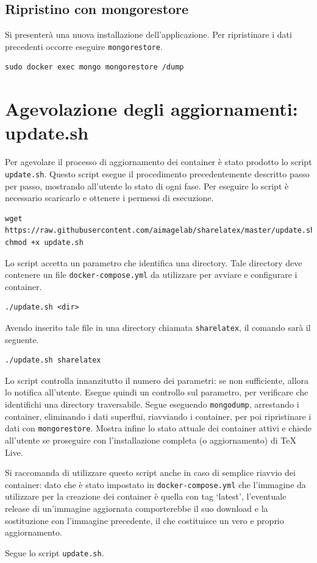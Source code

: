 \subsection{Ripristino con mongorestore}
Si presenterà una nuova installazione dell'applicazione. Per ripristinare i dati precedenti occorre eseguire \verb|mongorestore|.
\begin{lstlisting}
sudo docker exec mongo mongorestore /dump
\end{lstlisting}

\section{Agevolazione degli aggiornamenti: update.sh}
Per agevolare il processo di aggiornamento dei container è stato prodotto lo script \verb|update.sh|. Questo script esegue il procedimento precedentemente descritto passo per passo, mostrando all'utente lo stato di ogni fase. Per eseguire lo script è necessario scaricarlo e ottenere i permessi di esecuzione.
\begin{lstlisting}
wget https://raw.githubusercontent.com/aimagelab/sharelatex/master/update.sh
chmod +x update.sh
\end{lstlisting}
Lo script accetta un parametro che identifica una directory. Tale directory deve contenere un file \verb|docker-compose.yml| da utilizzare per avviare e configurare i container.
\begin{lstlisting}
./update.sh <dir>
\end{lstlisting}
Avendo inserito tale file in una directory chiamata \verb|sharelatex|, il comando sarà il seguente.
\begin{lstlisting}
./update.sh sharelatex
\end{lstlisting}
Lo script controlla innanzitutto il numero dei parametri: se non sufficiente, allora lo notifica all'utente. Esegue quindi un controllo sul parametro, per verificare che identifichi una directory traversabile. Segue eseguendo \verb|mongodump|, arrestando i container, eliminando i dati superflui, riavviando i container, per poi ripristinare i dati con \verb|mongorestore|. Mostra infine lo stato attuale dei container attivi e chiede all'utente se proseguire con l'installazione completa (o aggiornamento) di TeX Live.

Si raccomanda di utilizzare questo script anche in caso di semplice riavvio dei container: dato che è stato impostato in \verb|docker-compose.yml| che l'immagine da utilizzare per la creazione dei container è quella con tag \enquote*{latest}, l'eventuale release di un'immagine aggiornata comporterebbe il suo download e la sostituzione con l'immagine precedente, il che costituisce un vero e proprio aggiornamento.

Segue lo script \verb|update.sh|.
